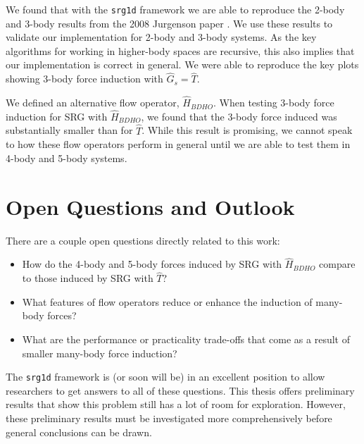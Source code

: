We found that with the \texttt{srg1d} framework we are able to reproduce the 2-body and 3-body results from the 2008 Jurgenson paper \cite{Jurgenson:2008jp}. We use these results to validate our implementation for 2-body and 3-body systems. As the key algorithms for working in higher-body spaces are recursive, this also implies that our implementation is correct in general. We were able to reproduce the key plots showing 3-body force induction with $\hat{G}_s=\hat{T}$.

We defined an alternative flow operator, $\hat{H}_{BDHO}$. When testing 3-body force induction for SRG with $\hat{H}_{BDHO}$, we found that the 3-body force induced was substantially smaller than for $\hat{T}$. While this result is promising, we cannot speak to how these flow operators perform in general until we are able to test them in 4-body and 5-body systems.

\section{Open Questions and Outlook}

There are a couple open questions directly related to this work:
\begin{itemize}
    \item How do the 4-body and 5-body forces induced by SRG with $\hat{H}_{BDHO}$ compare to those induced by SRG with $\hat{T}$?
    \item What features of flow operators reduce or enhance the induction of many-body forces?
    \item What are the performance or practicality trade-offs that come as a result of smaller many-body force induction?
\end{itemize}

The \texttt{srg1d} framework is (or soon will be) in an excellent position to allow researchers to get answers to all of these questions. This thesis offers preliminary results that show this problem still has a lot of room for exploration. However, these preliminary results must be investigated more comprehensively before general conclusions can be drawn. 
